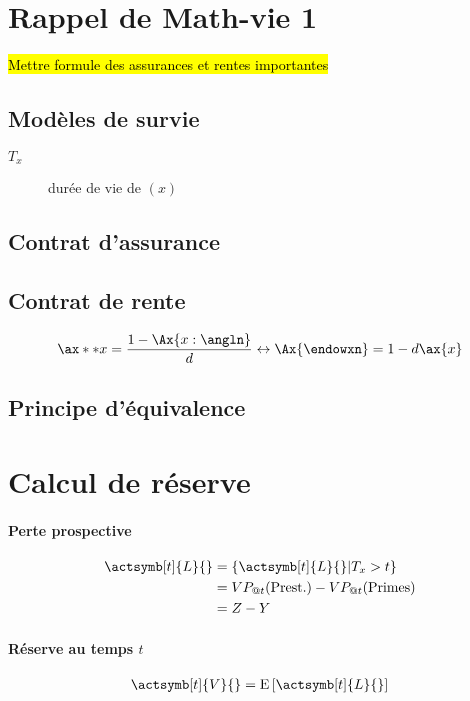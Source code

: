 \documentclass[10pt, french]{article}
\begin{document}
\begin{multicols*}{3} %
\section{Rappel de Math-vie 1}
\hl{Mettre formule des assurances et rentes importantes}
\subsection*{Modèles de survie}
\begin{description}
\item[$T_x$] durée de vie de $(x)$
\end{description}



\subsection*{Contrat d'assurance}

\subsection*{Contrat de rente}
\[\ax**{x} = \frac{1 - \Ax{x:\angln}}{d} \leftrightarrow \Ax{\endowxn} =1 - d \ax{x}\]




\subsection*{Principe d'équivalence}


\section{Calcul de réserve}
\paragraph{Perte prospective}
\begin{align*}
\actsymb[t]{L}{} & = \{ \actsymb[t]{L}{} | T_x > t \} \\
& = VP_{@t}(\text{Prest.}) - VP_{@t}(\text{Primes}) \\
& = Z - Y
\end{align*}

\paragraph{Réserve au temps $t$}
\begin{align*}
\actsymb[t]{V}{} = \esp{\actsymb[t]{L}{}}
\end{align*}











\end{multicols*}
\end{document}
